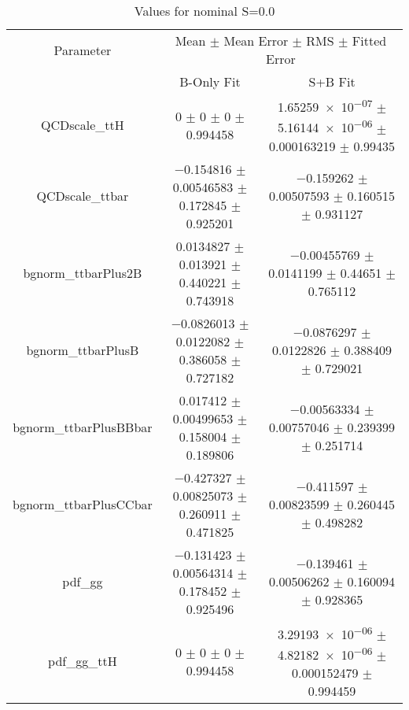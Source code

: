 \begin{table}
\centering
\caption{Values for nominal S=0.0}
\begin{tabular}{ccc}
\toprule
Parameter & \multicolumn{2}{c}{Mean $\pm$ Mean Error $\pm$ RMS $\pm$ Fitted Error}\\
 & B-Only Fit & S+B Fit\\
\midrule
QCDscale\_ttH & \num{0} $\pm$ \num{0} $\pm$ \num{0} $\pm$ \num{0.994458} & \num{1.65259e-07} $\pm$ \num{5.16144e-06} $\pm$ \num{0.000163219} $\pm$ \num{0.99435}\\
QCDscale\_ttbar & \num{-0.154816} $\pm$ \num{0.00546583} $\pm$ \num{0.172845} $\pm$ \num{0.925201} & \num{-0.159262} $\pm$ \num{0.00507593} $\pm$ \num{0.160515} $\pm$ \num{0.931127}\\
bgnorm\_ttbarPlus2B & \num{0.0134827} $\pm$ \num{0.013921} $\pm$ \num{0.440221} $\pm$ \num{0.743918} & \num{-0.00455769} $\pm$ \num{0.0141199} $\pm$ \num{0.44651} $\pm$ \num{0.765112}\\
bgnorm\_ttbarPlusB & \num{-0.0826013} $\pm$ \num{0.0122082} $\pm$ \num{0.386058} $\pm$ \num{0.727182} & \num{-0.0876297} $\pm$ \num{0.0122826} $\pm$ \num{0.388409} $\pm$ \num{0.729021}\\
bgnorm\_ttbarPlusBBbar & \num{0.017412} $\pm$ \num{0.00499653} $\pm$ \num{0.158004} $\pm$ \num{0.189806} & \num{-0.00563334} $\pm$ \num{0.00757046} $\pm$ \num{0.239399} $\pm$ \num{0.251714}\\
bgnorm\_ttbarPlusCCbar & \num{-0.427327} $\pm$ \num{0.00825073} $\pm$ \num{0.260911} $\pm$ \num{0.471825} & \num{-0.411597} $\pm$ \num{0.00823599} $\pm$ \num{0.260445} $\pm$ \num{0.498282}\\
pdf\_gg & \num{-0.131423} $\pm$ \num{0.00564314} $\pm$ \num{0.178452} $\pm$ \num{0.925496} & \num{-0.139461} $\pm$ \num{0.00506262} $\pm$ \num{0.160094} $\pm$ \num{0.928365}\\
pdf\_gg\_ttH & \num{0} $\pm$ \num{0} $\pm$ \num{0} $\pm$ \num{0.994458} & \num{3.29193e-06} $\pm$ \num{4.82182e-06} $\pm$ \num{0.000152479} $\pm$ \num{0.994459}\\
\bottomrule
\end{tabular}
\end{table}